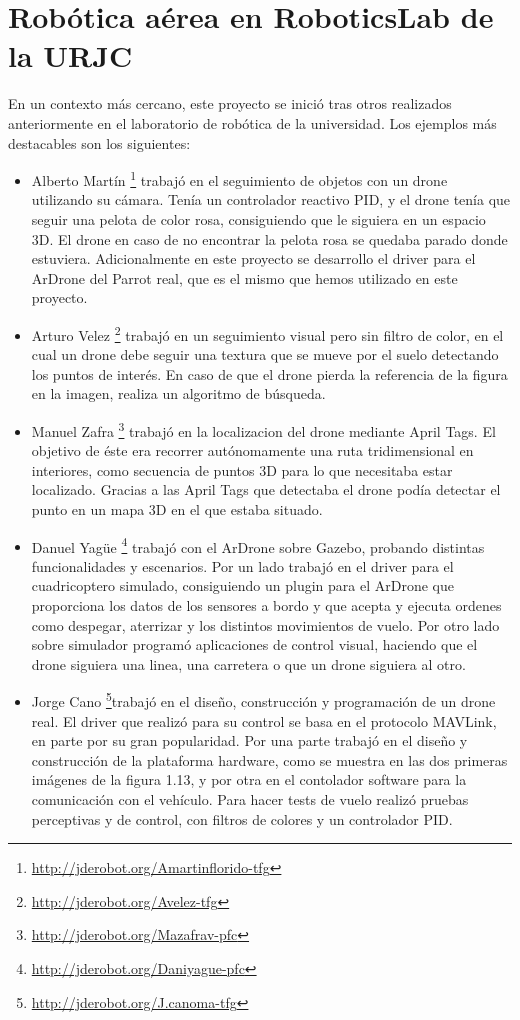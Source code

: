 \section{Robótica aérea en RoboticsLab de la URJC}
En un contexto más cercano, este proyecto se inició tras otros realizados
anteriormente en el laboratorio de robótica de la universidad. Los ejemplos más
destacables son los siguientes:
\begin{itemize}
\item Alberto Martín \footnote{\url{http://jderobot.org/Amartinflorido-tfg}} trabajó en el seguimiento de objetos con un drone
utilizando su cámara. Tenía un controlador reactivo PID, y el drone tenía que seguir una pelota de color rosa, consiguiendo que le siguiera en un espacio 3D. El drone en caso de no encontrar la pelota rosa se quedaba parado donde estuviera. Adicionalmente en este proyecto se desarrollo el driver para el ArDrone del Parrot real, que es el mismo que hemos utilizado en este proyecto.

\item Arturo Velez \footnote{\url{http://jderobot.org/Avelez-tfg}} trabajó en un seguimiento visual pero sin filtro de color,
en el cual un drone debe seguir una textura que se mueve por el suelo detectando los puntos de interés. En caso de que el drone pierda la referencia de la figura en la imagen, realiza un algoritmo de búsqueda.

\item Manuel Zafra \footnote{\url{http://jderobot.org/Mazafrav-pfc}} trabajó en la localizacion del drone mediante April Tags.
El objetivo de éste era recorrer autónomamente una ruta tridimensional en interiores,
como secuencia de puntos 3D para lo que necesitaba estar localizado. Gracias a las
April Tags que detectaba el drone podía detectar el punto en un mapa 3D en el que
estaba situado.

\item Danuel Yagüe \footnote{\url{http://jderobot.org/Daniyague-pfc}} trabajó con el ArDrone sobre Gazebo, probando distintas
funcionalidades y escenarios. Por un lado trabajó en el driver para el cuadricoptero
simulado, consiguiendo un plugin para el ArDrone que proporciona los datos de los
sensores a bordo y que acepta y ejecuta ordenes como despegar, aterrizar y los distintos
movimientos de vuelo. Por otro lado sobre simulador programó aplicaciones de control
visual, haciendo que el drone siguiera una linea, una carretera o que un drone siguiera
al otro.

\item Jorge Cano \footnote{\url{http://jderobot.org/J.canoma-tfg}}trabajó en el diseño, construcción y programación de un
drone real. El driver que realizó para su control se basa en el protocolo MAVLink, en
parte por su gran popularidad. Por una parte trabajó en el diseño y construcción de
la plataforma hardware, como se muestra en las dos primeras imágenes de la figura
1.13, y por otra en el contolador software para la comunicación con el vehículo. Para
hacer tests de vuelo realizó pruebas perceptivas y de control, con filtros de colores y
un controlador PID.
\end{itemize}

